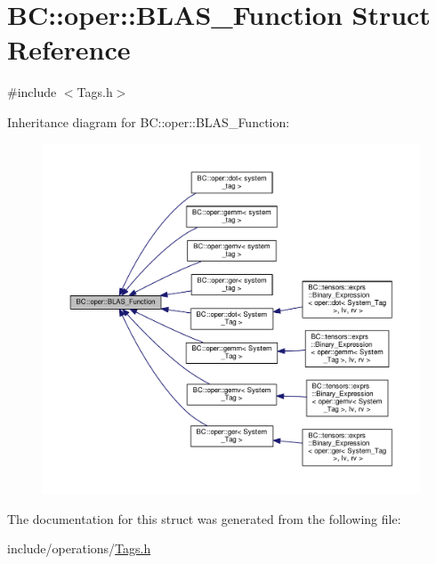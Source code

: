 \hypertarget{structBC_1_1oper_1_1BLAS__Function}{}\section{BC\+:\+:oper\+:\+:B\+L\+A\+S\+\_\+\+Function Struct Reference}
\label{structBC_1_1oper_1_1BLAS__Function}


{\ttfamily \#include $<$Tags.\+h$>$}



Inheritance diagram for BC\+:\+:oper\+:\+:B\+L\+A\+S\+\_\+\+Function\+:
\nopagebreak
\begin{figure}[H]
\begin{center}
\leavevmode
\includegraphics[width=350pt]{structBC_1_1oper_1_1BLAS__Function__inherit__graph}
\end{center}
\end{figure}


The documentation for this struct was generated from the following file\+:\begin{DoxyCompactItemize}
\item 
include/operations/\hyperlink{operations_2Tags_8h}{Tags.\+h}\end{DoxyCompactItemize}
